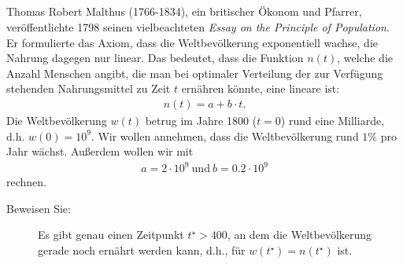 \subsection*{} 
Thomas Robert Malthus (1766-1834), ein britischer Ökonom und Pfarrer, veröffentlichte
1798 seinen vielbeachteten \textit{Essay on the Principle of Population}.
Er formulierte das Axiom, dass die Weltbevölkerung exponentiell wachse, die Nahrung dagegen nur linear. 
Das bedeutet, dass die Funktion $ n(t) $, welche die Anzahl Menschen angibt, die man bei optimaler Verteilung der zur Verfügung stehenden Nahrungsmittel zu Zeit $ t $ ernähren könnte, eine lineare ist:
\begin{align*}
	n(t) = a + b \cdot t.
\end{align*}
Die Weltbevölkerung $ w(t) $ betrug im Jahre 1800 ($ t= 0 $) rund eine Milliarde, d.h. $ w(0) = 10^9 $.
Wir wollen annehmen, dass die Weltbevölkerung rund $ 1\% $ pro Jahr wächst.
Außerdem wollen wir mit
\begin{align*}
	a = 2 \cdot 10^9 \ \textrm{und} \ b = 0.2 \cdot 10^9
\end{align*}
rechnen.
\begin{description}
	\item[Beweisen Sie:] 
	Es gibt genau einen Zeitpunkt $ t^\star > 400 $, an dem die Weltbevölkerung gerade noch ernährt werden kann, d.h., für $ w(t^\star)  = n(t^\star )$ ist.
\end{description}  
\
\\


